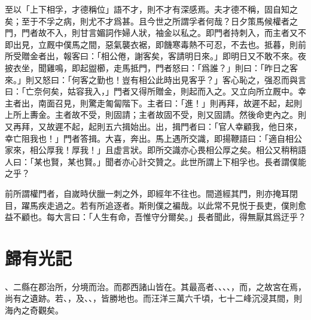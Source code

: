 至以「上下相孚，才德稱位」語不才，則不才有深感焉。夫才德不稱，固自知之矣；至于不孚之病，則尤不才爲甚。且今世之所謂孚者何哉？日夕策馬候權者之門，門者故不入，則甘言媚詞作婦人狀，袖金以私之。即門者持刺入，而主者又不即出見，立厩中僕馬之間，惡氣襲衣裾，即饑寒毒熱不可忍，不去也。抵暮，則前所受贈金者出，報客曰：「相公倦，謝客矣，客請明日來。」即明日又不敢不來。夜披衣坐，聞雞鳴，即起盥櫛，走馬抵門，門者怒曰：「爲誰？」則曰：「昨日之客來。」則又怒曰：「何客之勤也！豈有相公此時出見客乎？」客心恥之，强忍而與言曰：「亡奈何矣，姑容我入，」門者又得所贈金，則起而入之。又立向所立厩中。幸主者出，南面召見，則驚走匍匐階下。主者曰：「進！」則再拜，故遲不起，起則上所上夀金。主者故不受，則固請；主者故固不受，則又固請。然後命吏{內}之。則又再拜，又故遲不起，起則五六揖始出。出，揖門者曰：「官人幸顧我，他日來，幸{亡}阻我也！」門者答揖。大喜，奔出。馬上遇所交識，即揚鞭語曰：「適自相公家來，相公厚我！厚我！」且虚言狀。即所交識亦心畏相公厚之矣。相公又稍稍語人曰：「某也賢，某也賢。」聞者亦心計交贊之。此世所謂上下相孚也。長者謂僕能之乎？%

前所謂權門者，自嵗時伏臘一刺之外，即經年不往也。間道經其門，則亦掩耳閉目，躍馬疾走過之。若有所追逐者。斯則僕之褊{哉}。以此{常}不見悦于長吏，僕則愈益不顧也。每大言曰：「人生有命，吾惟守分爾矣。」長者聞{此}，得無厭其爲迂乎？%


\theendnotes

\section[吳山圖記\quad{\small 歸有光}]{{\normalsize 歸有光}\quad {}記}
、二縣在郡治所，分境而治。而郡西諸山皆在。其最高者、、、、，而，之故宮在焉，尚有之遺跡。若、，及、、，皆勝地也。而汪洋三萬六千頃，七十二峰沉浸其間，則海內之奇觀矣。

